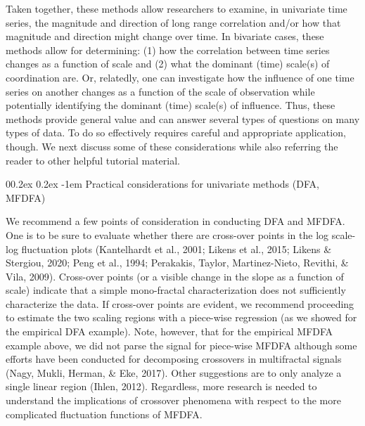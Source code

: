 \documentclass[
  man]{apa6}
\makeatletter
\let\oldparagraph\paragraph
\renewcommand{\paragraph}[1]{\oldparagraph{#1}\mbox{}}
\renewcommand{\paragraph}{\@startsection{paragraph}{4}{\parindent}%
  {0\baselineskip \@plus 0.2ex \@minus 0.2ex}%
  {-1em}%
  {\normalfont\normalsize\bfseries\itshape\typesectitle}}
\makeatother
\begin{document}
Taken together, these methods allow researchers to examine, in
univariate time series, the magnitude and direction of long range
correlation and/or how that magnitude and direction might change over
time. In bivariate cases, these methods allow for determining: (1) how
the correlation between time series changes as a function of scale and
(2) what the dominant (time) scale(s) of coordination are. Or,
relatedly, one can investigate how the influence of one time series on
another changes as a function of the scale of observation while
potentially identifying the dominant (time) scale(s) of influence. Thus,
these methods provide general value and can answer several types of
questions on many types of data. To do so effectively requires careful
and appropriate application, though. We next discuss some of these
considerations while also referring the reader to other helpful tutorial
material.

\hypertarget{practical-considerations-for-univariate-methods-dfa-mfdfa}{%
\paragraph{Practical considerations for univariate methods (DFA, MFDFA)}\label{practical-considerations-for-univariate-methods-dfa-mfdfa}}

We recommend a few points of consideration in conducting DFA and MFDFA.
One is to be sure to evaluate whether there are cross-over points in the
log scale-log fluctuation plots (Kantelhardt et al., 2001; Likens et al., 2015; Likens \& Stergiou, 2020; Peng et al., 1994; Perakakis, Taylor, Martinez-Nieto, Revithi, \& Vila, 2009).
Cross-over points (or a visible change in the slope as a function of
scale) indicate that a simple mono-fractal characterization does not
sufficiently characterize the data. If cross-over points are evident, we
recommend proceeding to estimate the two scaling regions with a
piece-wise regression (as we showed for the empirical DFA example).
Note, however, that for the empirical MFDFA example above, we did not
parse the signal for piece-wise MFDFA although some efforts have been
conducted for decomposing crossovers in multifractal signals
(Nagy, Mukli, Herman, \& Eke, 2017). Other suggestions are to only analyze a single linear
region (Ihlen, 2012). Regardless, more
research is needed to understand the implications of crossover phenomena
with respect to the more complicated fluctuation functions of MFDFA.
\end{document}

